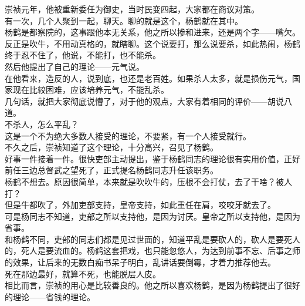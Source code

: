 \begin{multicols}{\theparacolNo}
崇祯元年，他被重新委任为御史，当时民变四起，大家都在商议对策。\\

有一次，几个人聚到一起，聊天。聊的就是这个，杨鹤就在其中。\\

杨鹤是都察院的，这事跟他本无关系，他之所以掺和进来，还是两个字——嘴欠。\\

反正是吹牛，不用动真格的，就瞎聊。这个说要打，那么说要杀，如此热闹，杨鹤终于忍不住了，他说，不能打，也不能杀。\\

然后他提出了自己的理论——元气说。\\

在他看来，造反的人，说到底，也还是老百姓。如果杀人太多，就是损伤元气，国家现在比较困难，应该培养元气，不能乱杀。\\

几句话，就把大家彻底说懵了，对于他的观点，大家有着相同的评价——胡说八道。\\

不杀人，怎么平乱？\\

这是一个不为绝大多数人接受的理论，不要紧，有一个人接受就行。\\

不久之后，崇祯知道了这个理论，十分高兴，召见了杨鹤。\\

好事一件接着一件。很快吏部主动提出，鉴于杨鹤同志的理论很有实用价值，正好前任三边总督武之望死了，正式提名杨鹤同志升任该职务。\\

杨鹤不想去。原因很简单，本来就是吹吹牛的，压根不会打仗，去了干啥？被人打？\\

但是牛都吹了，外加吏部支持，皇帝支持，如此重任在肩，咬咬牙就去了。\\

可是杨同志不知道，吏部之所以支持他，是因为讨厌。皇帝之所以支持他，是因为省事。\\

和杨鹤不同，吏部的同志们都是见过世面的，知道平乱是要砍人的，砍人是要死人的，死人是要流血的。杨鹤这套把戏，也只能忽悠人，为达到前事不忘、后事之师的效果，让后来的无数白痴书呆子明白，乱讲话要倒霉，才着力推荐他去。\\

死在那边最好，就算不死，也能脱层人皮。\\

相比而言，崇祯的用心是比较善良的。他之所以喜欢杨鹤，是因为杨鹤提出了很好的理论——省钱的理论。\\


\end{multicols}
